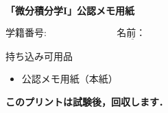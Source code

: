 \documentclass[dvipdfmx,a4paper,12pt]{jarticle}
\begin{document}
\begin{center}
{\bf \Large{「微分積分学I」公認メモ用紙}}
\end{center}

\hspace{6cm}
$\underline{学籍番号: \hspace{3cm} 名前：\hspace{5cm} }$








\vskip 20cm

{\scriptsize
\par\noindent
持ち込み可用品
\begin{itemize}
\item 公認メモ用紙（本紙）
\end{itemize}
}

\begin{center}
	{\bf このプリントは試験後，回収します．}
\end{center}







\end{document}
